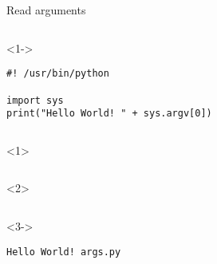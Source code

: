 \begin{frame}[fragile]{Read arguments}

  \begin{columns}[onlytextwidth]
    \begin{column}{\textwidth}
      \begin{onlyenv}<1->
        \begin{lstlisting}[style=python,title={args.py}]
#! /usr/bin/python

import sys
print("Hello World! " + sys.argv[0]) \end{lstlisting}
      \end{onlyenv}
    \end{column}
  \end{columns}

  \begin{columns}[onlytextwidth]
    \begin{column}{\textwidth}
      \begin{onlyenv}<1>
        \begin{lstlisting}[style=sh]

 \end{lstlisting}
      \end{onlyenv}

      \begin{onlyenv}<2>
        \begin{lstlisting}[style=sh]
%*\LSTPrompt*) python args.py
 \end{lstlisting}
      \end{onlyenv}

      \begin{onlyenv}<3->
        \begin{lstlisting}[style=sh]
%*\LSTPrompt*) python args.py
Hello World! args.py \end{lstlisting}
      \end{onlyenv}

    \end{column}
  \end{columns}

\end{frame}

